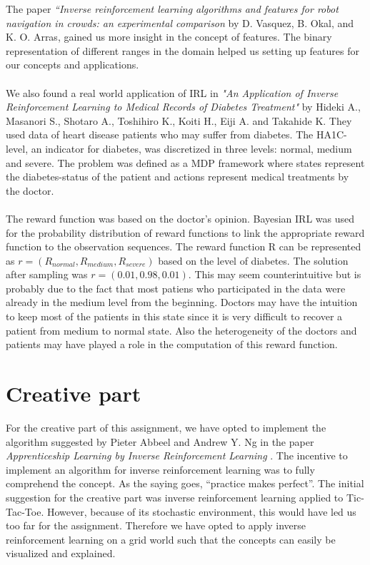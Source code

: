 \documentclass[10pt,a4paper,twocolumn]{article}
\begin{document}
The paper \textit{“Inverse reinforcement learning algorithms and features for robot navigation in crowds: an experimental comparison} \cite{vasquez2014inverse} by D. Vasquez, B. Okal, and K. O. Arras,  gained us more insight in the concept of features. The binary representation of different ranges in the domain helped us setting up features for our concepts and applications. \\\\We also found a real world application of IRL in \textit{"An Application of Inverse Reinforcement Learning to Medical Records of Diabetes Treatment"} \cite{medicalpaper} by Hideki A., Masanori S., Shotaro A., Toshihiro K., Koiti H., Eiji A. and Takahide K. They used data of heart disease patients who may suffer from diabetes. The HA1C-level, an indicator for diabetes, was discretized in three levels: normal, medium and severe. The problem was defined as a MDP framework where states represent the diabetes-status of the patient and actions represent medical treatments by the doctor.\\\\ The reward function was based on the doctor's opinion. Bayesian IRL was used for the probability distribution of reward functions to link the appropriate reward function to the observation sequences. The reward function R can be represented as $r= (R_{normal},R_{medium},R_{severe})$ based on the level of diabetes. The solution after sampling was $r= (0.01, 0.98, 0.01)$. This may seem counterintuitive but is probably due to the fact that most patiens who participated in the data were already in the medium level from the beginning. Doctors may have the intuition to keep most of the patients in this state since it is very difficult to recover a patient from medium to normal state. Also the heterogeneity of the doctors and patients may have played a role in the computation of this reward function.

\section{Creative part}
For the creative part of this assignment, we have opted to implement the algorithm suggested by Pieter Abbeel and Andrew Y. Ng  in the paper \textit{Apprenticeship Learning by Inverse Reinforcement Learning} \cite{abbeel2004apprenticeship}. The incentive to implement an algorithm for inverse reinforcement learning was to fully comprehend the concept. As the saying goes, ``practice makes perfect''. The initial suggestion for the creative part was inverse reinforcement learning applied to Tic-Tac-Toe. However, because of its stochastic environment, this would have led us too far for the assignment. Therefore we have opted to apply inverse reinforcement learning on a grid world such that the concepts can easily be visualized and explained.
\end{document}
